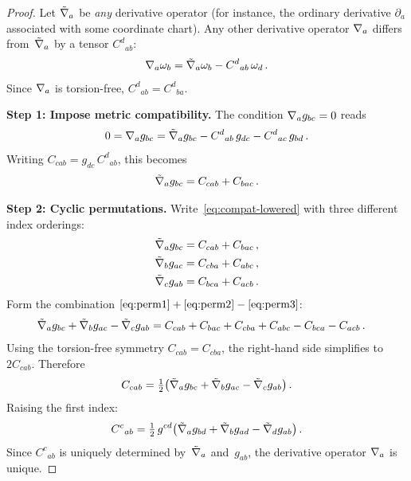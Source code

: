 \begin{proof}
  Let $\tilde{\nabla}_a$ be \emph{any} derivative operator
  (for instance, the ordinary derivative $\partial_a$ associated
  with some coordinate chart).  Any other derivative operator
  $\nabla_a$ differs from~$\tilde{\nabla}_a$ by a tensor
  $C^d{}_{ab}$:
  \[
    \nabla_a \omega_b
      = \tilde{\nabla}_a \omega_b - C^d{}_{ab}\, \omega_d\,.
  \]
  Since $\nabla_a$ is torsion-free, $C^d{}_{ab} = C^d{}_{ba}$.

  \smallskip
  \noindent\textbf{Step 1: Impose metric compatibility.}\;
  The condition $\nabla_a g_{bc} = 0$ reads
  \begin{equation}\label{eq:metric-compat-expand}
    0 = \nabla_a g_{bc}
      = \tilde{\nabla}_a g_{bc}
        - C^d{}_{ab}\, g_{dc}
        - C^d{}_{ac}\, g_{bd}\,.
  \end{equation}
  Writing $C_{cab} = g_{dc}\, C^d{}_{ab}$, this becomes
  \begin{equation}\label{eq:compat-lowered}
    \tilde{\nabla}_a g_{bc} = C_{cab} + C_{bac}\,.
  \end{equation}

  \noindent\textbf{Step 2: Cyclic permutations.}\;
  Write~\eqref{eq:compat-lowered} with three different index
  orderings:
  \begin{align}
    \tilde{\nabla}_a g_{bc} &= C_{cab} + C_{bac}\,,
      \label{eq:perm1}\\
    \tilde{\nabla}_b g_{ac} &= C_{cba} + C_{abc}\,,
      \label{eq:perm2}\\
    \tilde{\nabla}_c g_{ab} &= C_{bca} + C_{acb}\,.
      \label{eq:perm3}
  \end{align}
  Form the combination
  $\eqref{eq:perm1} + \eqref{eq:perm2} - \eqref{eq:perm3}$:
  \begin{align}
    \tilde{\nabla}_a g_{bc}
    + \tilde{\nabla}_b g_{ac}
    - \tilde{\nabla}_c g_{ab}
    &= C_{cab} + C_{bac}
     + C_{cba} + C_{abc}
     - C_{bca} - C_{acb}\,.
     \notag
  \end{align}
  Using the torsion-free symmetry
  $C_{cab} = C_{cba}$, the right-hand side simplifies to
  $2C_{cab}$.  Therefore
  \begin{equation}\label{eq:C-solved}
    C_{cab} = \tfrac{1}{2}\bigl(
      \tilde{\nabla}_a g_{bc}
      + \tilde{\nabla}_b g_{ac}
      - \tilde{\nabla}_c g_{ab}\bigr)\,.
  \end{equation}
  Raising the first index:
  \begin{equation}\label{eq:C-solved-raised}
    C^c{}_{ab} = \tfrac{1}{2}\, g^{cd}\bigl(
      \tilde{\nabla}_a g_{bd}
      + \tilde{\nabla}_b g_{ad}
      - \tilde{\nabla}_d g_{ab}\bigr)\,.
  \end{equation}
  Since $C^c{}_{ab}$ is uniquely determined
  by~$\tilde{\nabla}_a$ and~$g_{ab}$, the derivative operator
  $\nabla_a$ is unique.
\end{proof}

